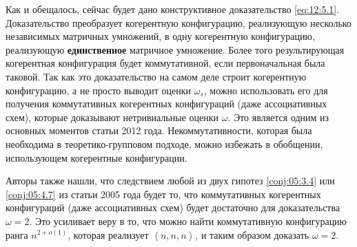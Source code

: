 Как и обещалось, сейчас будет дано конструктивное доказательство \eqref{eq:12:5.1}. Доказательство преобразует когерентную конфигурацию, реализующую несколько независимых матричных умножений, в одну когерентную конфигурацию, реализующую \textbf{единственное} матричное умножение. Более того результирующая когерентная конфигурация будет коммутативной, если первоначальная была таковой. Так как это доказательство на самом деле строит когерентную конфигурацию, а не просто выводит оценки $\omega_s$, можно использовать его для получения коммутативных когерентных конфигураций (даже ассоциативных схем), которые доказывают нетривиальные оценки $\omega$. Это является одним из основных моментов статьи 2012 года. Некоммутативности, которая была необходима в теоретико-групповом подходе, можно избежать в обобщении, использующем когерентные конфигурации.

Авторы также нашли, что следствием любой из двух гипотез \ref{conj:05:3.4} или \ref{conj:05:4.7} из статьи 2005 года будет то, что коммутативных когерентных конфигураций (даже ассоциативных схем) будет достаточно для доказательства $\omega=2$. Это усиливает веру в то, что можно найти коммутативную конфигурацию ранга $n^{2+o(1)}$, которая реализует $\left\langle n,n,n \right\rangle$, и таким образом доказать $\omega=2$.

